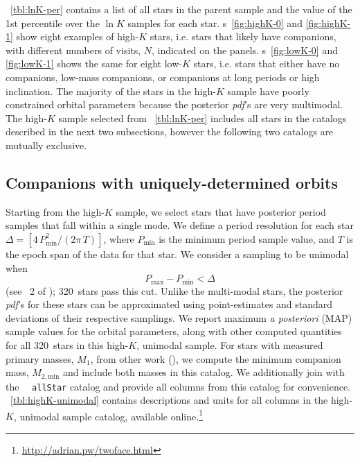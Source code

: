 \documentclass[modern, letterpaper]{aastex62}
\newcommand{\apogee}{\project{\acronym{APOGEE}}}
\newcommand{\DR}{\acronym{DR14}}
\newcommand{\pdf}{\textit{pdf}}
\newcommand{\nunimodal}{320}
\begin{document}
\tablename~\ref{tbl:lnK-per} contains a list of all stars in the parent sample
and the value of the 1st percentile over the $\ln K$ samples for each star.
\figurename s~\ref{fig:highK-0} and \ref{fig:highK-1} show eight examples of
high-$K$ stars, i.e. stars that likely have companions, with different numbers
of visits, $N$, indicated on the panels.
\figurename s~\ref{fig:lowK-0} and \ref{fig:lowK-1} shows the same for eight
low-$K$ stars, i.e. stars that either have no companions, low-mass companions,
or companions at long periods or high inclination.
The majority of the stars in the high-$K$ sample have poorly constrained orbital
parameters because the posterior \pdf 's are very multimodal.
The high-$K$ sample selected from \tablename~\ref{tbl:lnK-per} includes all
stars in the catalogs described in the next two subsections, however the
following two catalogs are mutually exclusive.


\subsection{Companions with uniquely-determined orbits}
\label{sec:catalog-unimodal}

Starting from the high-$K$ sample, we select stars that have posterior period
samples that fall within a single mode.
We define a period resolution for each star $\Delta =
\left[4\,P_{\textrm{min}}^2 / (2\pi \, T) \right]$, where $P_{\textrm{min}}$ is
the minimum period sample value, and $T$ is the epoch span of the data for that
star.
We consider a sampling to be unimodal when
\begin{equation}
    P_{\textrm{max}} - P_{\textrm{min}} < \Delta \label{eq:unimodal}
\end{equation}
(see \sectionname~2 of \citealt{Price-Whelan:2017}); \nunimodal\ stars
pass this cut.
Unlike the multi-modal stars, the posterior \pdf 's for these stars can be
approximated using point-estimates and standard deviations of their respective
samplings.
We report maximum \textit{a posteriori} (MAP) sample values for the orbital
parameters, along with other computed quantities for all \nunimodal\ stars in
this high-$K$, unimodal sample.
For stars with measured primary masses, $M_1$, from other work
(\citealt{Ness:2015}), we compute the minimum companion mass, $M_{2,
\textrm{min}}$ and include both masses in this catalog.
We additionally join with the \apogee\ \DR\ \texttt{allStar} catalog and provide
all columns from this catalog for convenience.
\tablename~\ref{tbl:highK-unimodal} contains descriptions and units for all
columns in the high-$K$, unimodal sample catalog, available online.\footnote{\url{http://adrian.pw/twoface.html}}
\end{document}
